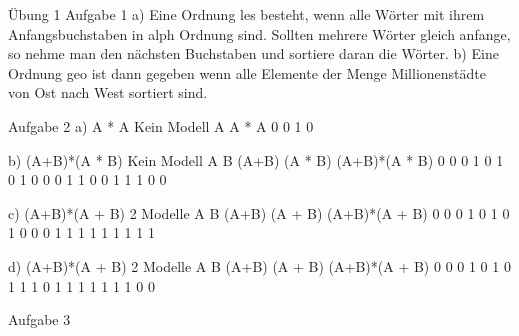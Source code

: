 Übung 1 
Aufgabe 1
a) Eine Ordnung les besteht, wenn alle Wörter  mit ihrem Anfangsbuchstaben in alph Ordnung sind.
   Sollten mehrere Wörter gleich anfange, so nehme man den nächsten Buchstaben und sortiere daran 
   die Wörter.
b) Eine Ordnung geo ist dann gegeben wenn alle Elemente der Menge Millionenstädte von Ost nach 
   West sortiert sind.
   
Aufgabe 2
a) A * \lnot A
Kein Modell
A	A * \lnot A
0	0
1	0

b) (A+B)*(\lnot A * \lnot B)
Kein Modell
A	B	(A+B)	(\lnot A * \lnot B)	(A+B)*(\lnot A * \lnot B)
0	0	0	1	0
1	0	1	0	0
0	1	1	0	0
1	1	1	0	0

c) (A+B)*(\lnot A + B)
2 Modelle
A	B	(A+B)	(\lnot A + B)	(A+B)*(\lnot A + B)
0	0	0	1	0
1	0	1	0	0
0	1	1	1	1
1	1	1	1	1

d) (A+B)*(\lnot A + \lnot B)
2 Modelle
A	B	(A+B)	(\lnot A + \lnot B)	(A+B)*(\lnot A + \lnot B)
0	0	0	1	0
1	0	1	1	1
0	1	1	1	1
1	1	1	0	0


Aufgabe 3